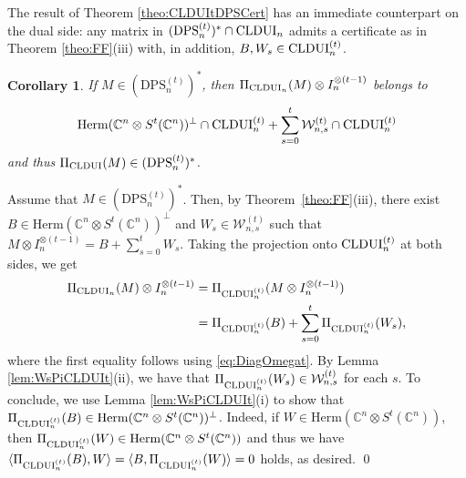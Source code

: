 \documentclass[11pt]{article}
\makeatletter
\newcommand{\C}{\ensuremath{\mathbb{C}}} %
\newcommand{\MV}{{\mathcal V}}
\newcommand{\MW}{{\mathcal W}}
\newcommand{\Herm}{\mathrm{Herm}}
\newcommand{\CLDUI}{\text{\rm CLDUI}}
\newcommand{\DPS}{\text{\rm DPS}}
\newcommand{\DPSt}{\mathrm{DPS}^{(t)}}
\newcommand{\ot}{\otimes}
\theoremstyle{plain}
\newtheorem{corollary}[satz]{Corollary}
\renewenvironment{proof}[1][\proofname]{%
  \par
  \pushQED{}%
  \normalfont
  \topsep6\p@\@plus6\p@
  \trivlist
  \item[\hskip\labelsep\itshape #1\@addpunct{.}]%
}{%
  \popQED
  \endtrivlist
}
\makeatother
\begin{document}
The result of Theorem \ref{theo:CLDUItDPSCert} has an immediate counterpart on the dual side: 
any matrix in $(\DPS^{(t)}_n)^*\cap\CLDUI_n$ admits a certificate as in Theorem \ref{theo:FF}(iii) with, in addition,  $B,W_s\in \CLDUI^{(t)}_n$. 


\begin{corollary}\label{cor:CLDUIt-dual}
If $M\in(\DPSt_n)^*$, then   $\Pi_{\CLDUI_n}(M)\ot I_n^{\ot (t-1)}$ belongs to 
\begin{align*}
\Herm(\C^n\ot S^t(\C^n))^\perp
\cap\CLDUI^{(t)}_n +\sum_{s=0}^t \MW^{(t)}_{n,s}\cap\CLDUI^{(t)}_n
\end{align*}
and thus $\Pi_{\CLDUI}(M)\in(\DPSt_n)^*$.
 \end{corollary}

\begin{proof}
Assume that   $M\in(\DPSt_n)^*$.   Then, by Theorem~\ref{theo:FF}(iii), there exist $B\in\Herm(\C^n\ot S^t(\C^n))^\perp$
and $W_s\in\MW^{(t)}_{n,s}$ such that 
    $M\ot I_n^{\ot (t-1)}=B+\sum_{s=0}^t W_s.$
Taking the projection onto  $\CLDUI^{(t)}_n$ at both sides, we get
  \begin{align*}
  \Pi_{\CLDUI_n}(M)\ot I_n^{\ot (t-1)} & = \Pi_{\CLDUI^{(t)}_n}(M\ot I_n^{\ot (t-1)}) \\
   & =\Pi_{\CLDUI^{(t)}_n}(B)+\sum_{s=0}^t \Pi_{\CLDUI^{(t)}_n}(W_s),
   \end{align*}
    where the first equality follows using    \eqref{eq:DiagOmegat}.
    By Lemma \ref{lem:WsPiCLDUIt}(ii), we have that $\Pi_{\CLDUI^{(t)}_n}(W_s)\in \MW^{(t)}_{n,s}$ for each $s$. 
    To conclude, we use Lemma   \ref{lem:WsPiCLDUIt}(i) to show that $\Pi_{\CLDUI^{(t)}_n}(B)\in\Herm(\C^n\ot S^t(\C^n))^\perp$. Indeed, if $W\in \Herm(\C^n\ot S^t(\C^n))$, then $\Pi_{\CLDUI^{(t)}_n}(W)\in\Herm(\C^n\ot S^t(\C^n))$ and thus we have $\langle  \Pi_{\CLDUI^{(t)}_n}(B),W\rangle =\langle B,\Pi_{\CLDUI^{(t)}_n}(W)\rangle =0$ holds, as desired. %
 \qed   \end{proof}
\end{document}
